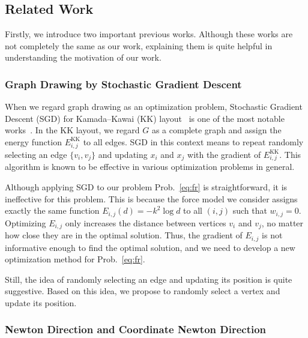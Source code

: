 \documentclass[dvipdfmx,10pt,journal,compsoc]{IEEEtran}
\begin{document}
\subsection{Related Work}\label{ssec:relatedWork}

Firstly, we introduce two important previous works. Although these works are not completely the same as our work, explaining them is quite helpful in understanding the motivation of our work.

\subsubsection{Graph Drawing by Stochastic Gradient Descent}\label{ssec:sgd}

When we regard graph drawing as an optimization problem, Stochastic Gradient Descent (SGD) for Kamada--Kawai (KK) layout~\cite{kamadaAlgorithmDrawingGeneral1989} is one of the most notable works~\cite{zhengGraphDrawingStochastic2019}.
In the KK layout, we regard $G$ as a complete graph and assign the energy function $E_{i,j}^{\mathrm{KK}}$ to all edges.
SGD in this context means to repeat randomly selecting an edge $\{v_i,v_j\}$ and updating $x_i$ and $x_j$ with the gradient of $E_{i,j}^{\mathrm{KK}}$. This algorithm is known to be effective in various optimization problems in general.

Although applying SGD to our problem Prob.~\eqref{eq:fr} is straightforward, it is ineffective for this problem.
This is because the force model we consider assigns exactly the same function $E_{i,j}(d)=-k^2\log{d}$ to all $(i,j)$ such that $w_{i,j}=0$. Optimizing $E_{i,j}$ only increases the distance between vertices $v_i$ and $v_j$, no matter how close they are in the optimal solution. Thus, the gradient of $E_{i,j}$ is not informative enough to find the optimal solution, and we need to develop a new optimization method for Prob.~\eqref{eq:fr}.

Still, the idea of randomly selecting an edge and updating its position is quite suggestive. Based on this idea, we propose to randomly select a vertex and update its position.

\subsubsection{Newton Direction and Coordinate Newton Direction}\label{ssec:introNewton}
\end{document}
